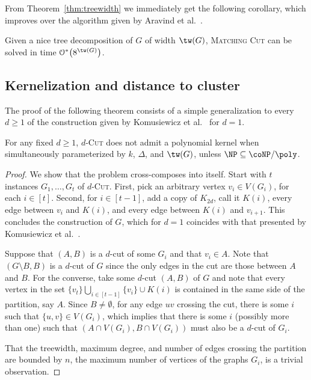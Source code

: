 \documentclass[a4paper,UKenglish,cleveref, autoref]{lipics-v2019}
\newcommand{\bigOs}[1]{\mathcal{O}^*\!\left(#1\right)}
\newcommand{\pname}[1]{\textsc{#1}}
\begin{document}
From Theorem~\ref{thm:treewidth} we immediately get the following corollary, which improves over the algorithm given by Aravind et al.~\cite{matching_cut_structural}.

\begin{corollary}
   Given a nice tree decomposition of $G$ of width $\tw(G)$, \pname{Matching Cut} can be solved in time  $\bigOs{8^{\tw(G)}}$.
\end{corollary}

\subsection{Kernelization and distance to cluster}
\label{sec:kernelization}

The proof of the following theorem consists of a simple generalization to every $d \geq 1$ of the construction given by Komusiewicz et al.~\cite{matching_cut_ipec}  for $d=1$.

\begin{theorem}\label{thm:no-kernel}
    For any fixed $d \geq 1$, \pname{$d$-Cut} does not admit a polynomial kernel when simultaneously parameterized by $k$, $\Delta$, and $\tw(G)$, unless $\NP \subseteq \coNP/\poly$.
\end{theorem}

\begin{proof}
    We show that the problem cross-composes into itself.
    Start with $t$ instances $G_1, \dots, G_t$ of \pname{$d$-Cut}.
    First, pick an arbitrary vertex $v_i \in V(G_i)$, for each $i \in [t]$.
    Second, for $i \in [t-1]$,  add a copy of $K_{2d}$, call it $K(i)$, every edge between $v_i$ and $K(i)$, and every edge between $K(i)$ and $v_{i+1}$.
    This concludes the construction of $G$, which  for $d=1$ coincides with that presented by Komusiewicz et al.~\cite{matching_cut_ipec}.

    Suppose that $(A, B)$ is a $d$-cut of some $G_i$ and that $v_i \in A$.
    Note that $(G \setminus B, B)$ is a $d$-cut of $G$ since the only edges in the cut are those between $A$ and $B$.
    For the converse, take some $d$-cut $(A, B)$ of $G$ and note that every vertex in the set $\{v_t\} \bigcup_{i \in [t-1]}\{v_i\} \cup K(i)$ is contained in the same side of the partition, say $A$.
    Since $B \neq \emptyset$, for any edge $uv$ crossing the cut, there is some $i$ such that $\{u,v\} \in V(G_i)$, which implies that there is some $i$ (possibly more than one) such that $(A \cap V(G_i), B \cap V(G_i))$ must also be a $d$-cut of $G_i$.

    That the treewidth, maximum degree, and number of edges crossing the partition are bounded by $n$, the maximum number of vertices of the graphs $G_i$, is a trivial observation.
\end{proof}
\end{document}
